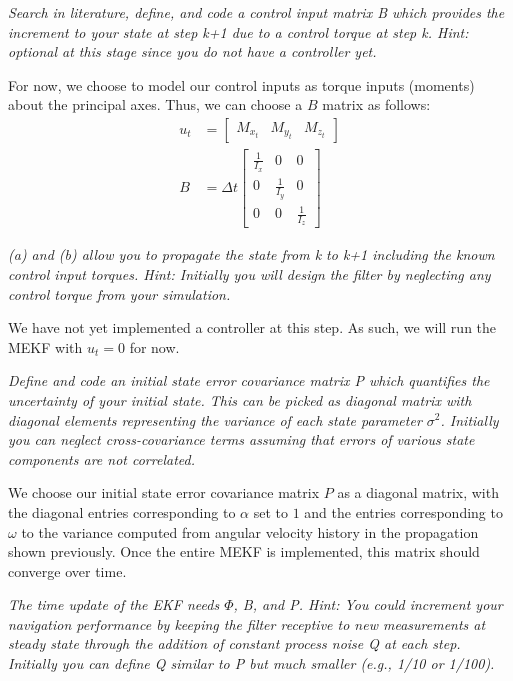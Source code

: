 \textit{Search in literature, define, and code a control input matrix B which provides the increment to your state at step k+1 due to a control torque at step k. Hint: optional at this stage since you do not have a controller yet.}

For now, we choose to model our control inputs as torque inputs (moments) about the principal axes. Thus, we can choose a $B$ matrix as follows:
\begin{align*}
    u_{t} &= \begin{bmatrix}
        M_{x_{t}} & M_{y_{t}} & M_{z_{t}}
    \end{bmatrix} \\
    B &= \Delta t \begin{bmatrix}
        \frac{1}{I_{x}} & 0 & 0 \\
        0 & \frac{1}{I_{y}} & 0 \\
        0 & 0 & \frac{1}{I_{z}}
    \end{bmatrix}
\end{align*}

\textit{(a) and (b) allow you to propagate the state from k to k+1 including the known control input torques. Hint: Initially you will design the filter by neglecting any control torque from your simulation.}

We have not yet implemented a controller at this step. As such, we will run the MEKF with $u_{t} = 0$ for now.

\textit{Define and code an initial state error covariance matrix P which quantifies the uncertainty of your initial state. This can be picked as diagonal matrix with diagonal elements representing the variance of each state parameter $\sigma^{2}$. Initially you can neglect cross-covariance terms assuming that errors of various state components are not correlated.}

We choose our initial state error covariance matrix $P$ as a diagonal matrix, with the diagonal entries corresponding to $\alpha$ set to $1$ and the entries corresponding to $\omega$ to the variance computed from angular velocity history in the propagation shown previously. Once the entire MEKF is implemented, this matrix should converge over time.

\textit{The time update of the EKF needs $\Phi$, B, and P. Hint: You could increment your navigation performance by keeping the filter receptive to new measurements at steady state through the addition of constant process noise Q at each step. Initially you can define Q similar to P but much smaller (e.g., 1/10 or 1/100).}


